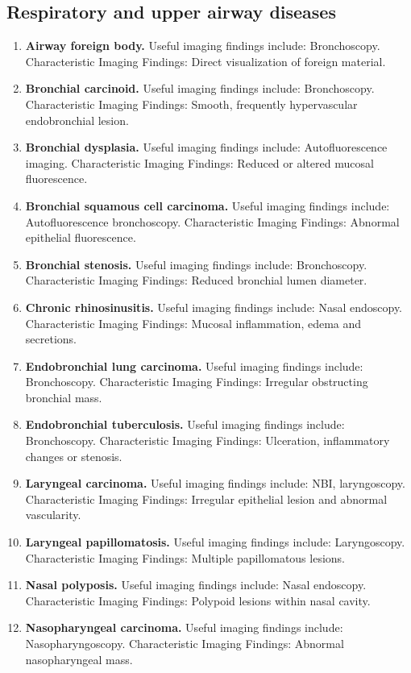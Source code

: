 \subsection{Respiratory and upper airway diseases}
\begin{enumerate}[leftmargin=*,itemsep=0.45em,topsep=0.4em]
\item \textbf{Airway foreign body.} Useful imaging findings include: Bronchoscopy. Characteristic Imaging Findings: Direct visualization of foreign material.
\item \textbf{Bronchial carcinoid.} Useful imaging findings include: Bronchoscopy. Characteristic Imaging Findings: Smooth, frequently hypervascular endobronchial lesion.
\item \textbf{Bronchial dysplasia.} Useful imaging findings include: Autofluorescence imaging. Characteristic Imaging Findings: Reduced or altered mucosal fluorescence.
\item \textbf{Bronchial squamous cell carcinoma.} Useful imaging findings include: Autofluorescence bronchoscopy. Characteristic Imaging Findings: Abnormal epithelial fluorescence.
\item \textbf{Bronchial stenosis.} Useful imaging findings include: Bronchoscopy. Characteristic Imaging Findings: Reduced bronchial lumen diameter.
\item \textbf{Chronic rhinosinusitis.} Useful imaging findings include: Nasal endoscopy. Characteristic Imaging Findings: Mucosal inflammation, edema and secretions.
\item \textbf{Endobronchial lung carcinoma.} Useful imaging findings include: Bronchoscopy. Characteristic Imaging Findings: Irregular obstructing bronchial mass.
\item \textbf{Endobronchial tuberculosis.} Useful imaging findings include: Bronchoscopy. Characteristic Imaging Findings: Ulceration, inflammatory changes or stenosis.
\item \textbf{Laryngeal carcinoma.} Useful imaging findings include: NBI, laryngoscopy. Characteristic Imaging Findings: Irregular epithelial lesion and abnormal vascularity.
\item \textbf{Laryngeal papillomatosis.} Useful imaging findings include: Laryngoscopy. Characteristic Imaging Findings: Multiple papillomatous lesions.
\item \textbf{Nasal polyposis.} Useful imaging findings include: Nasal endoscopy. Characteristic Imaging Findings: Polypoid lesions within nasal cavity.
\item \textbf{Nasopharyngeal carcinoma.} Useful imaging findings include: Nasopharyngoscopy. Characteristic Imaging Findings: Abnormal nasopharyngeal mass.

\end{enumerate}
